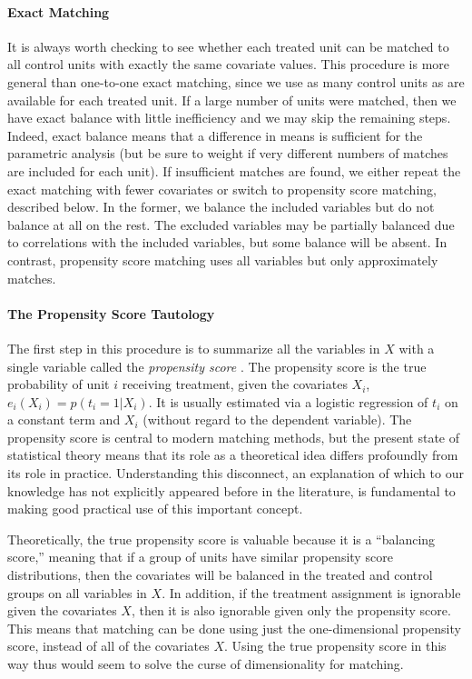 \documentclass[11pt,titlepage]{article}
\begin{document}
\paragraph{Exact Matching}  
It is always worth checking to see whether each treated unit can be
matched to all control units with exactly the same covariate values.
This procedure is more general than one-to-one exact matching, since
we use as many control units as are available for each treated unit.
If a large number of units were matched, then we have exact balance
with little inefficiency and we may skip the remaining steps.  Indeed,
exact balance means that a difference in means is sufficient for the
parametric analysis (but be sure to weight if very different numbers
of matches are included for each unit).  If insufficient matches are
found, we either repeat the exact matching with fewer covariates or
switch to propensity score matching, described below.  In the former,
we balance the included variables but do not balance at all on the
rest.  The excluded variables may be partially balanced due to
correlations with the included variables, but some balance will be
absent.  In contrast, propensity score matching uses all variables but
only approximately matches.

\paragraph{The Propensity Score Tautology}
The first step in this procedure is to summarize all the variables in
$X$ with a single variable called the \emph{propensity score}
\citep{RosRub83}.  The propensity score is the true probability of
unit $i$ receiving treatment, given the covariates $X_i$, $e_i(X_i) =
p(t_i=1 | X_i)$.  It is usually estimated via a logistic regression of
$t_i$ on a constant term and $X_i$ (without regard to the dependent
variable).  The propensity score is central to modern matching
methods, but the present state of statistical theory means that its
role as a theoretical idea differs profoundly from its role in
practice.  Understanding this disconnect, an explanation of which to
our knowledge has not explicitly appeared before in the literature, is
fundamental to making good practical use of this important concept.

Theoretically, the true propensity score is valuable because it is a
``balancing score,'' meaning that if a group of units have similar
propensity score distributions, then the covariates will be balanced
in the treated and control groups on all variables in $X$.  In
addition, if the treatment assignment is ignorable given the
covariates $X$, then it is also ignorable given only the propensity
score.  This means that matching can be done using just the
one-dimensional propensity score, instead of all of the covariates
$X$.  Using the true propensity score in this way thus would seem to
solve the curse of dimensionality for matching.
\end{document}

